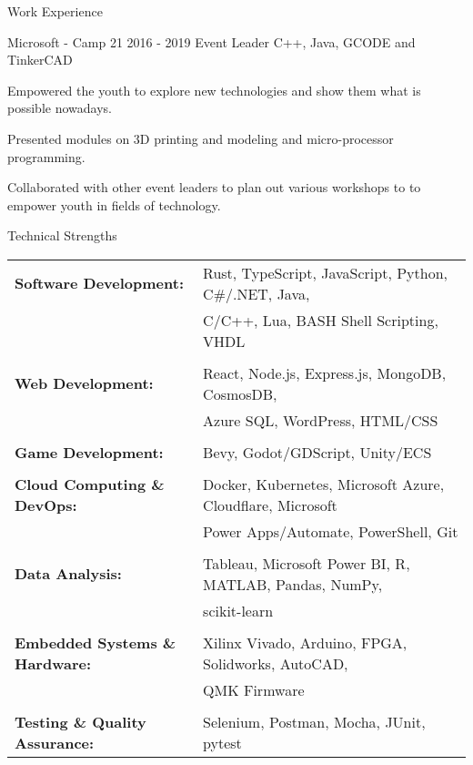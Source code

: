 \documentclass{resume}
\begin{document}
\begin{rSection}{Work Experience}
        \begin{rSubsection}
        {Microsoft - Camp 21}
        {2016 - 2019}
        {Event Leader}
        {C++, Java, GCODE and TinkerCAD}
            \item Empowered the youth to explore new technologies and show them what is possible nowadays.
            \item Presented modules on 3D printing and modeling and micro-processor programming.
            \item Collaborated with other event leaders to plan out various workshops to to empower youth in fields of technology.
        \end{rSubsection}
    \end{rSection}

\begin{rSection}{Technical Strengths}
    \begin{tabular}{ @{} >{\bfseries}l @{\hspace{2ex}} l }
    
        Software Development:           & Rust, TypeScript, JavaScript, Python, C\#/.NET, Java, \\
                                        & C/C++, Lua, BASH Shell Scripting, VHDL \\\\[-4pt]

        Web Development:                & React, Node.js, Express.js, MongoDB, CosmosDB, \\
                                        & Azure SQL, WordPress, HTML/CSS \\\\[-4pt]

        Game Development:               & Bevy, Godot/GDScript, Unity/ECS \\\\[-4pt]

        Cloud Computing \& DevOps:      & Docker, Kubernetes, Microsoft Azure, Cloudflare, Microsoft \\
                                        & Power Apps/Automate, PowerShell, Git \\\\[-4pt]

        Data Analysis:                  & Tableau, Microsoft Power BI, R, MATLAB, Pandas, NumPy, \\
                                        & scikit-learn \\\\[-4pt]

        Embedded Systems \& Hardware:   & Xilinx Vivado, Arduino, FPGA, Solidworks, AutoCAD, \\
                                        & QMK Firmware \\\\[-4pt]

        Testing \& Quality Assurance:   & Selenium, Postman, Mocha, JUnit, pytest
    \end{tabular}
\end{rSection}
\end{document}
